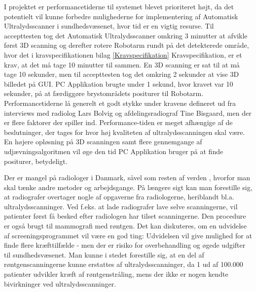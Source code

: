 I projektet er performancetiderne til systemet blevet prioriteret højt, da det potentielt vil kunne forbedre mulighederne for implementering af Automatisk Ultralydsscanner i sundhedsvæsenet, hvor tid er en vigtig resurse. Til accepttesten tog det Automatisk Ultralydsscanner omkring 3 minutter at afvikle først 3D scanning og derefter rotere Robotarm rundt på det detekterede område, hvor det i kravspecifikationen bilag \ref{Kravspecifikation} Kravspecifikation, er et krav, at det må tage 10 minutter til sammen. En 3D scanning er sat til at må tage 10 sekunder, men til accepttesten tog det omkring 2 sekunder at vise 3D billedet på GUI. PC Applikation brugte under 1 sekund, hvor kravet var 10 sekunder, på at færdiggøre brystområdets positurer til Robotarm. Performancetiderne lå generelt et godt stykke under kravene defineret ud fra interviews med radiolog Lars Bolvig og afdelingsradiograf Tine Bisgaard, men der er flere faktorer der spiller ind. Performance-tiden er meget afhængige af de beslutninger, der tages for hvor høj kvaliteten af ultralydsscanningen skal være. En højere opløsning på 3D scanningen samt flere gennemgange af udjævningsalgoritmen vil øge den tid PC Applikation bruger på at finde positurer, betydeligt.  

Der er mangel på radiologer i Danmark, såvel som resten af verden \cite{Lagemangel}, hvorfor man skal tænke andre metoder og arbejdsgange. På længere sigt kan man forestille sig, at radiografer overtager nogle af opgaverne fra radiologerne, heriblandt bl.a. ultralydsscanninger. Ved f.eks. at lade radiografer lave selve scanningerne, vil patienter først få besked efter radiologen har tilset scanningerne. Den procedure er også brugt til mammografi med røntgen. Det kan diskuteres, om en udvidelse af screeningsprogrammet vil være en god ting: Udvidelsen vil give mulighed for at finde flere kræfttilfælde - men der er risiko for overbehandling og øgede udgifter til sundhedsvæsenet. Man kunne i stedet forestille sig, at en del af røntgenscanningerne kunne erstattes af ultralydsscanninger, da 1 ud af 100.000 \cite{RiskRontgen} patienter udvikler kræft af røntgenstråling, mens der ikke er nogen kendte bivirkninger ved ultralydsscanninger.

